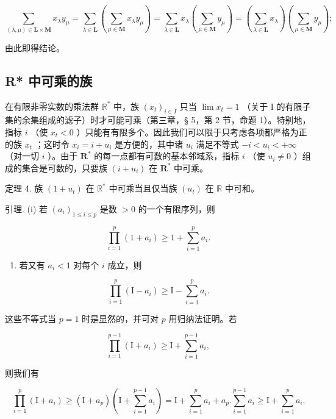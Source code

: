 \[
\sum_ {(\lambda , \mu) \in \mathbf {L} \times \mathbf {M}} x _ {\lambda} y _ {\mu} = \sum_ {\lambda \in \mathbf {L}} (\sum_ {\mu \in \mathbf {M}} x _ {\lambda} y _ {\mu}) = \sum_ {\lambda \in \mathbf {L}} x _ {\lambda} (\sum_ {\mu \in \mathbf {M}} y _ {\mu}) = (\sum_ {\lambda \in \mathbf {L}} x _ {\lambda}) (\sum_ {\mu \in \mathbf {M}} y _ {\mu});
\]

由此即得结论。

\subsection{R* 中可乘的族}

在有限非零实数的乘法群 \(\mathbb{R}^*\) 中，族 \((x_{t})_{i\in I}\) 只当 \(\lim x_{t} = 1\) （关于 I 的有限子集的余集组成的滤子）时才可能可乘（第三章，§ 5，第 2 节，命题 1）。特别地，指标 \(i\) （使 \(x_{t} < 0\) ）只能有有限多个。因此我们可以限于只考虑各项都严格为正的族 \(x_{t}\) ；这时令 \(x_{i} = i + u_{i}\) 是方便的，其中诸 \(u_{i}\) 满足不等式 \(-i < u_{i} < +\infty\) （对一切 \(i\) ）。由于 \(\mathbf{R}^*\) 的每一点都有可数的基本邻域系，指标 \(i\) （使 \(u_{i} \neq 0\) ）组成的集合是可数的，只要族 \((i + u_{i})\) 在 \(\mathbf{R}^*\) 中可乘。

定理 4. 族 \((1 + u_{t})\) 在 \(\mathbb{R}^*\) 中可乘当且仅当族 \((u_{t})\) 在 \(\mathbb{R}\) 中可和。

引理. (i) 若 \((a_{i})_{1\leqslant i\leqslant p}\) 是数 \(>0\) 的一个有限序列，则

\[
\prod_ {i = 1} ^ {p} \left(1 + a _ {i}\right) \geqslant 1 + \sum_ {i = 1} ^ {p} a _ {i}.\tag{2}
\]

\begin{enumerate}
\def\labelenumi{(\roman{enumi})}
\setcounter{enumi}{1}
\tightlist
\item
  若又有 \(a_i < 1\) 对每个 \(i\) 成立，则
\end{enumerate}

\[
\prod_ {i = 1} ^ {p} \left(\mathrm{I} - a _ {i}\right) \geqslant \mathrm{I} - \sum_ {i = 1} ^ {p} a _ {i}.\tag{3}
\]

这些不等式当 \(p = 1\) 时是显然的，并可对 \(p\) 用归纳法证明。若

\[
\prod_ {i = 1} ^ {p - 1} \left(\mathrm{I} + a _ {i}\right) \geqslant \mathrm{I} + \sum_ {i = 1} ^ {p - 1} a _ {i},
\]

则我们有

\[
\prod_ {i = 1} ^ {p} \left(\mathrm{I} + a _ {i}\right) \geqslant \left(\mathrm{I} + a _ {p}\right) \left(\mathrm{I} + \sum_ {i = 1} ^ {p - 1} a _ {i}\right) = \mathrm{I} + \sum_ {i = 1} ^ {p} a _ {i} + a _ {p}. \sum_ {i = 1} ^ {p - 1} a _ {i} \geqslant \mathrm{I} + \sum_ {i = 1} ^ {p} a _ {i}.
\]

